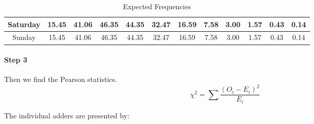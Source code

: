 \documentclass[a4paper]{article}
\begin{document}
\begin{table}[!htbp]
\begin{tabular}{|c|c|c|c|c|c|c|c|c|c|c|c|}
    \hline
    \rowcolor[rgb]{ .867,  .922,  .969} Saturday & \cellcolor[rgb]{ 1,  1,  1}15.45  & \cellcolor[rgb]{ 1,  1,  1}41.06  & \cellcolor[rgb]{ 1,  1,  1}46.35  & \cellcolor[rgb]{ 1,  1,  1}44.35  & \cellcolor[rgb]{ 1,  1,  1}32.47  & \cellcolor[rgb]{ 1,  1,  1}16.59  & \cellcolor[rgb]{ 1,  1,  1}7.58  & \cellcolor[rgb]{ 1,  1,  1}3.00  & \cellcolor[rgb]{ 1,  1,  1}1.57  & \cellcolor[rgb]{ 1,  1,  1}0.43  & \cellcolor[rgb]{ 1,  1,  1}0.14  \\
    \hline
    \rowcolor[rgb]{ .867,  .922,  .969} Sunday & \cellcolor[rgb]{ 1,  1,  1}15.45  & \cellcolor[rgb]{ 1,  1,  1}41.06  & \cellcolor[rgb]{ 1,  1,  1}46.35  & \cellcolor[rgb]{ 1,  1,  1}44.35  & \cellcolor[rgb]{ 1,  1,  1}32.47  & \cellcolor[rgb]{ 1,  1,  1}16.59  & \cellcolor[rgb]{ 1,  1,  1}7.58  & \cellcolor[rgb]{ 1,  1,  1}3.00  & \cellcolor[rgb]{ 1,  1,  1}1.57  & \cellcolor[rgb]{ 1,  1,  1}0.43  & \cellcolor[rgb]{ 1,  1,  1}0.14  \\
    \hline
    \end{tabular}%
  \caption{Expected Frequencies}
\end{table}%

\paragraph{Step 3} Then we find the Pearson statistics.
$$\chi^2 = \sum \frac { \left( O _ { i } - E _ { i } \right) ^{ 2 } } { E _ { i } }$$

The individual adders are presented by:

\newpage
\end{document}
